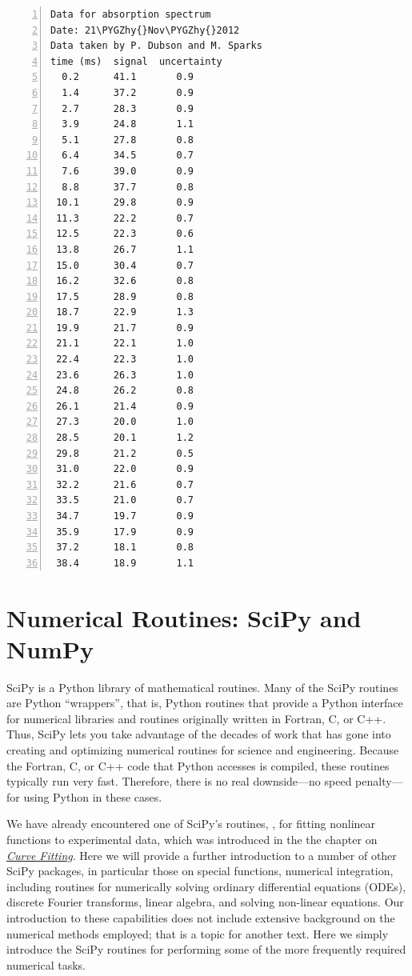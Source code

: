 \documentclass[letterpaper,10pt,english]{sphinxmanual}
\def\PYGZhy{\char`\-}
\begin{document}
\begin{enumerate}
\begin{enumerate}
\begin{Verbatim}[commandchars=\\\{\},numbers=left,firstnumber=1,stepnumber=1]
Data for absorption spectrum
Date: 21\PYGZhy{}Nov\PYGZhy{}2012
Data taken by P. Dubson and M. Sparks
time (ms)  signal  uncertainty
  0.2      41.1       0.9
  1.4      37.2       0.9
  2.7      28.3       0.9
  3.9      24.8       1.1
  5.1      27.8       0.8
  6.4      34.5       0.7
  7.6      39.0       0.9
  8.8      37.7       0.8
 10.1      29.8       0.9
 11.3      22.2       0.7
 12.5      22.3       0.6
 13.8      26.7       1.1
 15.0      30.4       0.7
 16.2      32.6       0.8
 17.5      28.9       0.8
 18.7      22.9       1.3
 19.9      21.7       0.9
 21.1      22.1       1.0
 22.4      22.3       1.0
 23.6      26.3       1.0
 24.8      26.2       0.8
 26.1      21.4       0.9
 27.3      20.0       1.0
 28.5      20.1       1.2
 29.8      21.2       0.5
 31.0      22.0       0.9
 32.2      21.6       0.7
 33.5      21.0       0.7
 34.7      19.7       0.9
 35.9      17.9       0.9
 37.2      18.1       0.8
 38.4      18.9       1.1
\end{Verbatim}

\end{enumerate}

\end{enumerate}


\chapter{Numerical Routines: SciPy and NumPy}
\label{chap9/chap9_scipy::doc}\label{chap9/chap9_scipy:numerical-routines-scipy-and-numpy}\label{chap9/chap9_scipy:chap9}
SciPy is a Python library of mathematical routines.  Many of the SciPy routines are Python ``wrappers'', that is, Python routines that provide a Python interface for numerical libraries and routines originally written in Fortran, C, or C++.  Thus, SciPy lets you take advantage of the decades of work that has gone into creating and optimizing numerical routines for science and engineering.  Because the Fortran, C, or C++ code that Python accesses is compiled, these routines typically run very fast.  Therefore, there is no real downside---no speed penalty---for using Python in these cases.

We have already encountered one of SciPy's routines, , for fitting nonlinear functions to experimental data, which was introduced in the the chapter on {\hyperref[chap8/chap8_fitting:chap8]{\emph{Curve Fitting}}}.   Here we will provide a further introduction to a number of other SciPy packages, in particular those on special functions, numerical integration, including routines for numerically solving ordinary differential equations (ODEs), discrete Fourier transforms, linear algebra, and solving non-linear equations.  Our introduction to these capabilities does not include extensive background on the numerical methods employed; that is a topic for another text.  Here we simply introduce the SciPy routines for performing some of the more frequently required numerical tasks.
\end{document}
